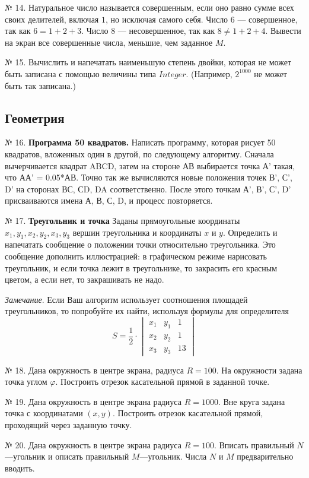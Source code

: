 № 14. Натуральное число называется совершенным, если оно равно сумме всех своих делителей, включая $1$, но исключая самого себя. Число $6$ --- совершенное, так как $6 = 1 + 2 + 3$. Число $8$ --- несовершенное, так как $8\neq 1 + 2 + 4$. Вывести на экран все совершенные числа, меньшие, чем заданное $M$.

№ 15. Вычислить и напечатать наименьшую степень двойки, которая не может быть записана с помощью величины типа $Integer$. (Например, $2^{1000}$ не может быть так записана.)

\subsection{Геометрия}

№ 16. {\bf Программа 50 квадратов.} Написать программу, которая рисует 50 квадратов, вложенных один в другой, по следующему алгоритму. Сначала вычерчивается квадрат ABCD, затем на стороне АВ выбирается точка А' такая, что АА' = 0.05*АВ. Точно так же вычисляются новые положения точек В', С', D' на сторонах ВС, СD, DA соответственно. После этого точкам А', В', С', D' присваиваются имена А, В, С, D, и процесс повторяется.

№ 17. {\bf Треугольник и точка} 
Заданы   прямоугольные координаты $x_1, y_1,x_2,y_2,x_3,y_3$ вершин треугольника и координаты $x$ и $y$. Определить и напечатать сообщение о положении точки относительно треугольника. Это сообщение дополнить иллюстрацией: в графическом режиме нарисовать треугольник, и если точка лежит в треугольнике, то закрасить его красным цветом, а если нет, то закрашивать не надо.

{\em Замечание}.   Если Ваш алгоритм использует соотношения площадей треугольников, то попробуйте их найти, используя формулы для определителя
$$S = \frac{1}{2} 
\cdot\begin{vmatrix} 
    x_1 & y_1 & 1\\
    x_2 & y_2 & 1\\
    x_3 & y_3 & 13
\end{vmatrix}
$$

№ 18. Дана окружность в центре экрана, радиуса $R=100$.  На окружности задана точка углом $\varphi$. Построить отрезок касательной прямой в заданной точке.

№ 19. Дана окружность в центре экрана радиуса $R=100$0. Вне круга задана точка с координатами $(x,y)$. Построить отрезок касательной прямой, проходящий через заданную точку.

№ 20. Дана окружность в центре экрана радиуса $R=100$. Вписать правильный $N$ ---угольник и описать правильный $M$---угольник. Числа $N$ и $M$ предварительно вводить.

